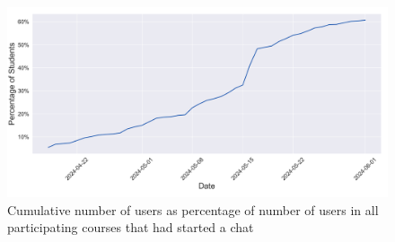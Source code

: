 \begin{figure}[H]
    \centering
    \includegraphics[width=\textwidth]{results/plots/assets/usage-06-number-of-sessions-per-day.png}
    \caption{Cumulative number of users as percentage of number of users in all participating courses that had started a chat}
    \label{fig:usage_06_number_of_sessions_per_day}
\end{figure}
